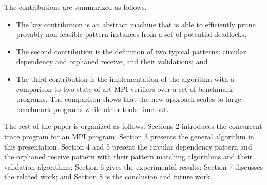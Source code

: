 
The contributions are summarized as follows.
\begin{itemize}
\item The key contribution is an abstract machine that is able to efficiently prune provably non-feasible pattern instances from a set of potential deadlocks; 
\item The second contribution is the definition of two typical patterns: circular dependency and orphaned receive, and their validations; and
\item The third contribution is the implementation of the algorithm with a comparison to two state-of-art MPI verifiers over a set of benchmark programs. The comparison shows that the new approach scales to large benchmark programs while other tools time out.
\end{itemize}


The rest of the paper is organized as follows: Sections 2 introduces the concurrent trace program for an MPI program; Section 3 presents the general algorithm in this presentation, Section 4 and 5 present the circular dependency pattern and the orphaned receive pattern with their pattern matching algorithms and their validation algorithms; Section 6 gives the experimental results; Section 7 discusses the related work; and Section 8 is the conclusion and future work.